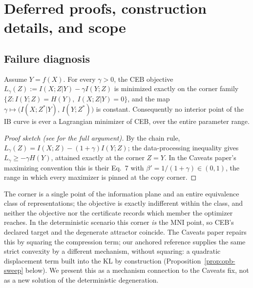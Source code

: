 \section{Deferred proofs, construction details, and scope}
\label{app:deferred}

\subsection{Failure diagnosis}
\label{app:diagnosis}

\begin{proposition}
\label{prop:dead}
Assume $Y = f(X)$. For every $\gamma > 0$, the CEB objective
$L_\gamma(Z) := I(X;Z|Y) - \gamma I(Y;Z)$ is minimized exactly on the corner family
$\{Z : I(Y;Z) = H(Y),\; I(X;Z|Y) = 0\}$, and the map
$\gamma \mapsto \bigl(I(X;Z^*|Y),\, I(Y;Z^*)\bigr)$ is constant. Consequently no
interior point of the IB curve is ever a Lagrangian minimizer of CEB, over the entire
parameter range.
\end{proposition}

\begin{proof}[Proof sketch (see \citet{kolchinsky2019caveats} for the full argument)]
By the chain rule, $L_\gamma(Z) = I(X;Z) - (1+\gamma)I(Y;Z)$; the data-processing
inequality gives $L_\gamma \ge -\gamma H(Y)$, attained exactly at the corner
$Z = Y$. In the Caveats paper's maximizing convention this is their Eq.~7 with
$\beta' = 1/(1+\gamma) \in (0,1)$, the range in which every maximizer is pinned at the
copy corner.
\end{proof}

The corner is a single point of the information plane and an entire equivalence class
of representations; the objective is exactly indifferent within the class, and neither
the objective nor the certificate records which member the optimizer reaches. In the
deterministic scenario this corner \emph{is} the MNI point, so CEB's declared target
and the degenerate attractor coincide. The Caveats paper repairs this by squaring the
compression term; our anchored reference supplies the same strict convexity by a
different mechanism, without squaring: a quadratic displacement term built into the
KL by construction (Proposition~\ref{prop:opb-sweep} below). We present this as a
mechanism connection to the Caveats fix, not as a new solution of the deterministic
degeneration.

